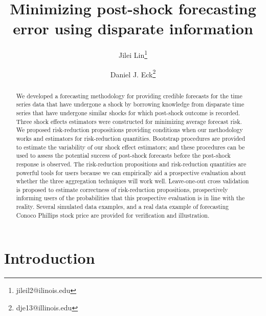 \documentclass[11pt]{article}
\title{Minimizing post-shock forecasting error using disparate information}
\author{Jilei Lin\thanks{jileil2@ilinois.edu} }
\author{Daniel J. Eck\thanks{dje13@illinois.edu}}
\affil{Department of Statistics, University of Illinois at Urbana-Champaign}
\theoremstyle{definition}
\begin{document}
\maketitle
\begin{abstract}
    We developed a forecasting methodology for providing credible forecasts for the time series data that have undergone a shock  by borrowing knowledge from disparate time series that have undergone similar shocks for which post-shock outcome is recorded. Three shock effects estimators were constructed for minimizing average forecast risk. We proposed risk-reduction propositions providing conditions when our methodology works and estimators for risk-reduction quantities. Bootstrap procedures are provided to estimate the variability of our shock effect estimators; and these procedures can be used to assess the potential success of post-shock forecasts before the post-shock response is observed. The risk-reduction propositions and risk-reduction quantities are powerful tools for users because we can empirically aid a prospective evaluation about whether the three aggregation techniques  will work well. Leave-one-out cross validation is proposed to estimate correctness of risk-reduction propositions, prospectively informing users of the probabilities that this prospective evaluation is in line with the reality. Several simulated data examples, and a real data example of forecasting Conoco Phillips stock price are provided for verification and illustration.
\end{abstract}




\section{Introduction}
\end{document}
